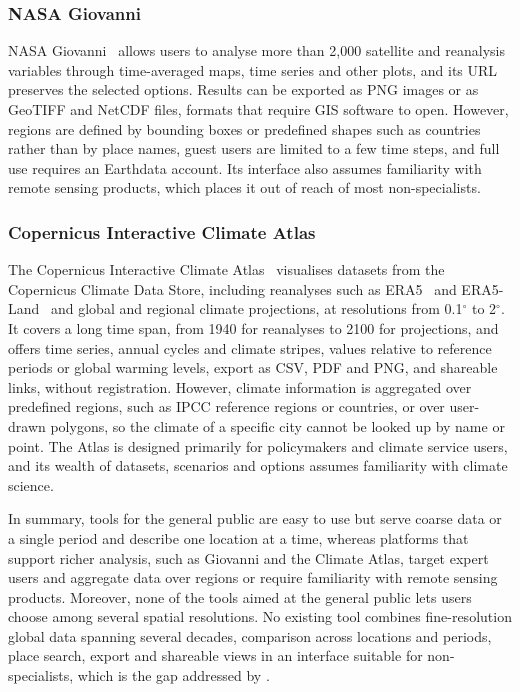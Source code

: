 \subsubsection{NASA Giovanni}\label{sec:related:existing-tools:nasa-giovanni}
NASA Giovanni~\cite{acker2022using} allows users to analyse more than 2{,}000 satellite
and reanalysis variables through time-averaged maps, time series and other plots, and
its URL preserves the selected options. Results can be exported as PNG images or as
GeoTIFF and NetCDF files, formats that require GIS software to open. 
However, regions are defined by bounding boxes
or predefined shapes such as countries rather than by place names, guest users are
limited to a few time steps, and full use requires an Earthdata account. Its interface
also assumes familiarity with remote sensing products, which places it out of reach of
most non-specialists.

\subsubsection{Copernicus Interactive Climate Atlas}\label{sec:related:existing-tools:c3s-atlas}
The Copernicus Interactive Climate Atlas~\cite{c3satlas} visualises datasets from the
Copernicus Climate Data Store, including reanalyses such as ERA5~\cite{hersbach2020era5}
and ERA5-Land~\cite{munoz2021era5} and global and regional climate projections, at
resolutions from 0.1$^\circ$ to 2$^\circ$. It covers a long time span, from
1940 for reanalyses to 2100 for projections, and offers time series, annual cycles and
climate stripes, values relative to reference periods or global warming levels, export
as CSV, PDF and PNG, and shareable links, without registration. However, climate
information is aggregated over predefined regions, such as IPCC reference regions or
countries, or over user-drawn polygons, so the climate of a specific city cannot be
looked up by name or point. The Atlas is designed primarily for policymakers and climate
service users, and its wealth of datasets, scenarios and options assumes familiarity
with climate science.

In summary, tools for the general public are easy to use but serve coarse data or a
single period and describe one location at a time, whereas platforms that support richer
analysis, such as Giovanni and the Climate Atlas, target expert users and aggregate data
over regions or require familiarity with remote sensing products. Moreover, none of the
tools aimed at the general public lets users choose among several spatial resolutions.
No existing tool combines fine-resolution global data spanning several decades,
comparison across locations and periods, place search, export and shareable views in an
interface suitable for non-specialists, which is the gap addressed by \webappname{}.

